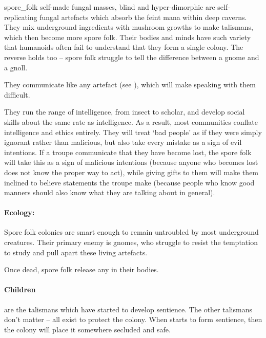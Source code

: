 \begin{multicols}{2}
  {spore_folk}%
  {self-made fungal masses, blind and hyper-dimorphic}%
are self-replicating fungal \glspl{artefact} which absorb the feint mana within deep caverns.
They mix underground \glspl{ingredient} with mushroom growths to make \glspl{talisman}, which then become more spore folk.
Their bodies and minds have such variety that humanoids often fail to understand that they form a single colony.
The reverse holds too -- spore folk struggle to tell the difference between a gnome and a gnoll.

They communicate like any \gls{artefact} (see ), which will make speaking with them difficult.

They run the range of intelligence, from insect to scholar, and develop social skills about the same rate as intelligence.
As a result, most communities conflate intelligence and ethics entirely.
They will treat `bad people' as if they were simply ignorant rather than malicious, but also take every mistake as a sign of evil intentions.
If a troupe communicate that they have become lost, the spore folk will take this as a sign of malicious intentions (because anyone who becomes lost does not know the proper way to act), while giving gifts to them will make them inclined to believe statements the troupe make (because people who know good manners should also know what they are talking about in general).

\paragraph{Ecology:}
Spore folk colonies are smart enough to remain untroubled by most underground creatures.
Their primary enemy is gnomes, who struggle to resist the temptation to study and pull apart these living \glspl{artefact}.

Once dead, spore folk release any  in their bodies.

\paragraph{Children}
are the \glspl{talisman} which have started to develop sentience.
The other \glspl{talisman} don't matter -- all exist to protect the colony.
When  starts to form sentience, then the colony will place it somewhere secluded and safe.

\wotWosFungus

\showTalisman


\end{multicols}
